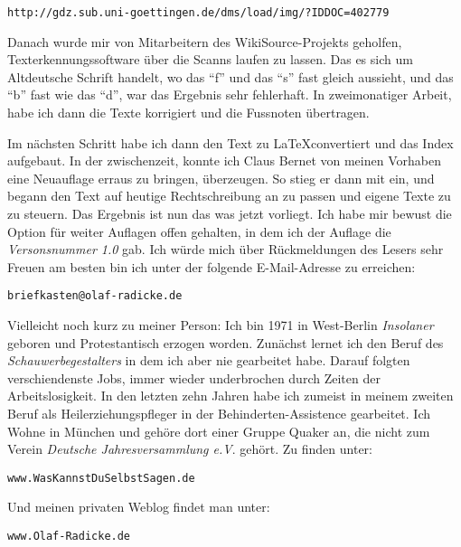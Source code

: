 \begin{center}
\texttt{http://gdz.sub.uni-goettingen.de/dms/load/img/?IDDOC=402779}
\end{center}

Danach wurde mir von Mitarbeitern des WikiSource-Projekts geholfen, Texterkennungssoftware über die Scanns laufen zu lassen. Das es sich um Altdeutsche Schrift handelt, wo das "`f"' und das "`s"' fast gleich aussieht, und das "`b"' fast wie das "`d"', war das Ergebnis sehr fehlerhaft. In zweimonatiger Arbeit, habe ich dann die Texte korrigiert und die Fussnoten übertragen.

\medskip

Im nächsten Schritt habe ich dann den Text zu \LaTeX convertiert und das Index aufgebaut. In der zwischenzeit, konnte ich Claus Bernet von meinen Vorhaben eine Neuauflage erraus zu bringen, überzeugen. So stieg er dann mit ein, und begann den Text auf heutige Rechtschreibung an zu passen und eigene Texte zu zu steuern. Das Ergebnis ist nun das was jetzt vorliegt. Ich habe mir bewust die Option für weiter Auflagen offen gehalten, in dem ich der Auflage die \textit{Versonsnummer 1.0} gab. Ich würde mich über Rückmeldungen des Lesers sehr Freuen am besten bin ich unter der folgende E-Mail-Adresse zu erreichen:

\begin{center}
\texttt{briefkasten@olaf-radicke.de}
\end{center}

Vielleicht noch kurz zu meiner Person: Ich bin 1971 in West-Berlin \textit{Insolaner} geboren und Protestantisch erzogen worden. Zunächst lernet ich den Beruf des \textit{Schauwerbegestalters} in dem ich aber nie gearbeitet habe. Darauf folgten verschiendenste Jobs, immer wieder underbrochen durch Zeiten der Arbeitslosigkeit. In den letzten zehn Jahren habe ich zumeist in meinem zweiten Beruf als Heilerziehungspfleger in der Behinderten-Assistence gearbeitet. Ich Wohne in München und gehöre dort einer Gruppe Quaker an, die nicht zum Verein \textit{Deutsche Jahresversammlung e.V}. gehört. Zu finden unter:

\begin{center}
\texttt{www.WasKannstDuSelbstSagen.de}
\end{center}

Und meinen privaten Weblog findet man unter:

\begin{center}
\texttt{www.Olaf-Radicke.de}
\end{center}

